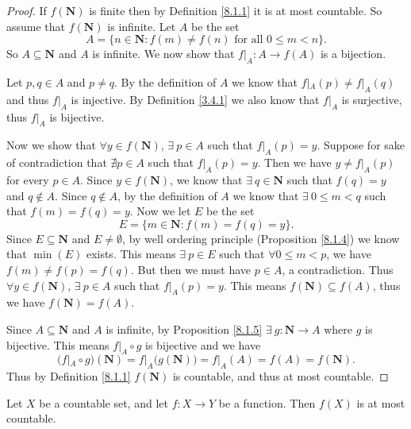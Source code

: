 \begin{proof}
    If \(f(\mathbf{N})\) is finite then by Definition \ref{8.1.1} it is at most countable.
    So assume that \(f(\mathbf{N})\) is infinite.
    Let \(A\) be the set
    \[
        A = \{n \in \mathbf{N} : f(m) \neq f(n) \text{ for all } 0 \leq m < n\}.
    \]
    So \(A \subseteq \mathbf{N}\) and \(A\) is infinite.
    We now show that \(f|_A : A \to f(A)\) is a bijection.

    Let \(p, q \in A\) and \(p \neq q\).
    By the definition of \(A\) we know that \(f|_A(p) \neq f|_A(q)\) and thus \(f|_A\) is injective.
    By Definition \ref{3.4.1} we also know that \(f|_A\) is surjective, thus \(f|_A\) is bijective.

    Now we show that \(\forall y \in f(\mathbf{N})\), \(\exists\ p \in A\) such that \(f|_A(p) = y\).
    Suppose for sake of contradiction that \(\nexists p \in A\) such that \(f|_A(p) = y\).
    Then we have \(y \neq f|_A(p)\) for every \(p \in A\).
    Since \(y \in f(\mathbf{N})\), we know that \(\exists\ q \in \mathbf{N}\) such that \(f(q) = y\) and \(q \notin A\).
    Since \(q \notin A\), by the definition of \(A\) we know that \(\exists\ 0 \leq m < q\) such that \(f(m) = f(q) = y\).
    Now we let \(E\) be the set
    \[
        E = \{m \in \mathbf{N} : f(m) = f(q) = y\}.
    \]
    Since \(E \subseteq \mathbf{N}\) and \(E \neq \emptyset\), by well ordering principle (Proposition \ref{8.1.4}) we know that \(\min(E)\) exists.
    This means \(\exists\ p \in E\) such that \(\forall 0 \leq m < p\), we have \(f(m) \neq f(p) = f(q)\).
    But then we must have \(p \in A\), a contradiction.
    Thus \(\forall y \in f(\mathbf{N})\), \(\exists\ p \in A\) such that \(f|_A(p) = y\).
    This means \(f(\mathbf{N}) \subseteq f(A)\), thus we have \(f(\mathbf{N}) = f(A)\).

    Since \(A \subseteq \mathbf{N}\) and \(A\) is infinite, by Proposition \ref{8.1.5} \(\exists\ g : \mathbf{N} \to A\) where \(g\) is bijective.
    This means \(f|_A \circ g\) is bijective and we have
    \[
        (f|_A \circ g)(\mathbf{N}) = f|_A\big(g(\mathbf{N})\big) = f|_A(A) = f(A) = f(\mathbf{N}).
    \]
    Thus by Definition \ref{8.1.1} \(f(\mathbf{N})\) is countable, and thus at most countable.
\end{proof}

\begin{corollary}\label{8.1.9}
    Let \(X\) be a countable set, and let \(f : X \to Y\) be a function.
    Then \(f(X)\) is at most countable.
\end{corollary}

